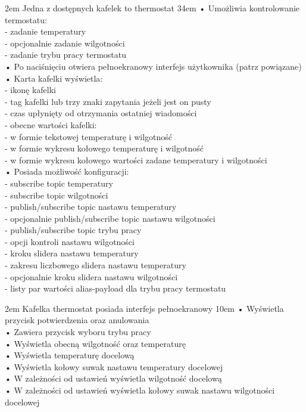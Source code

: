 {2em}{
    Jedna z dostępnych kafelek to thermostat
}
{34em}{
    • Umożliwia kontrolowanie termostatu:\\
    - zadanie temperatury\\
    - opcjonalnie zadanie wilgotności\\
    - zadanie trybu pracy termostatu\\

    • Po naciśnięciu otwiera pełnoekranowy interfejs użytkownika (patrz powiązane)\\

    • Karta kafelki wyświetla:\\
    - ikonę kafelki\\
    - tag kafelki lub trzy znaki zapytania jeżeli jest on pusty\\
    - czas upłynięty od otrzymania ostatniej wiadomości\\
    - obecne wartości kafelki:\\
    \hspace*{0.5em} - w formie tekstowej temperaturę i wilgotność\\
    \hspace*{0.5em} - w formie wykresu kołowego temperaturę i wilgotność\\
    \hspace*{0.5em} - w formie wykresu kołowego wartości zadane temperatury i wilgotności\\
    
    • Posiada możliwość konfiguracji:\\
    - subscribe topic temperatury\\
    - subscribe topic wilgotności\\
    - publish/subscribe topic nastawu temperatury\\
    - opcjonalnie publish/subscribe topic nastawu wilgotności\\
    - publish/subscribe topic trybu pracy\\
    - opcji kontroli nastawu wilgotności\\
    - kroku slidera nastawu temperatury\\
    - zakresu liczbowego slidera nastawu temperatury\\
    - opcjonalnie kroku slidera nastawu wilgotności\\
    - listy par wartości alias-payload dla trybu pracy termostatu
}

{2em}{
    Kafelka thermostat posiada interfejs pełnoekranowy}
{10em}{
    • Wyświetla przycisk potwierdzenia oraz anulowania\\
    • Zawiera przycisk wyboru trybu pracy\\
    • Wyświetla obecną wilgotność oraz temperaturę\\
    • Wyświetla temperaturę docelową\\
    • Wyświetla kołowy suwak nastawu temperatury docelowej\\
    • W zależności od ustawień wyświetla wilgotność docelową\\
    • W zależności od ustawień wyświetla kołowy suwak nastawu wilgotności docelowej
}

